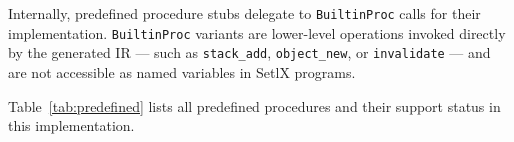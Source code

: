 Internally, predefined procedure stubs delegate to \texttt{BuiltinProc} calls for their implementation. \texttt{BuiltinProc} variants are lower-level operations invoked directly by the generated IR --- such as \texttt{stack\_add}, \texttt{object\_new}, or \texttt{invalidate} --- and are not accessible as named variables in SetlX programs.

Table~\ref{tab:predefined} lists all predefined procedures and their support status in this implementation.
